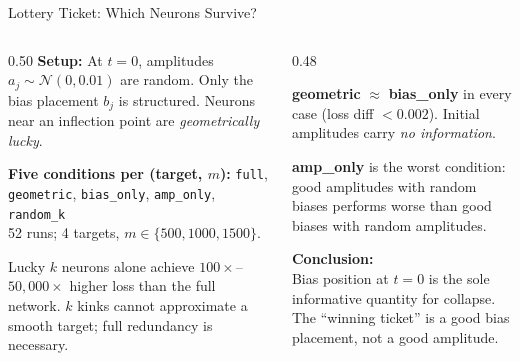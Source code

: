 \documentclass[aspectratio=169, 10pt]{beamer}
\begin{document}
\begin{frame}{Lottery Ticket: Which Neurons Survive?}
  \begin{columns}[T]
    \begin{column}{0.50\textwidth}
      \small
      \textbf{Setup:} At $t=0$, amplitudes
      $a_j \sim \mathcal{N}(0,0.01)$ are random.
      Only the bias placement $b_j$ is structured.
      Neurons near an inflection point are
      \emph{geometrically lucky}.

      \vspace{0.4em}
      \textbf{Five conditions per (target, $m$):}
      \texttt{full}, \texttt{geometric}, \texttt{bias\_only},
      \texttt{amp\_only}, \texttt{random\_k}\\[3pt]
      52 runs; 4 targets, $m \in \{500, 1000, 1500\}$.

      \vspace{0.4em}
      \begin{tcolorbox}[slideboxB, title={Claim 2 (performance): FALSE}]
        \small
        Lucky $k$ neurons alone achieve
        $100\times$--$50{,}000\times$ higher loss
        than the full network.
        $k$ kinks cannot approximate a smooth target;
        full redundancy is necessary.
      \end{tcolorbox}
    \end{column}
    \begin{column}{0.48\textwidth}
      \begin{tcolorbox}[slideboxC,
                        title={Claim 1 (survival): bias position is key}]
        \small
        \textbf{geometric} $\approx$ \textbf{bias\_only}
        in every case (loss diff $< 0.002$).
        Initial amplitudes carry \emph{no information}.

        \vspace{4pt}
        \textbf{amp\_only} is the worst condition:
        good amplitudes with random biases performs
        worse than good biases with random amplitudes.

        \vspace{4pt}
        \textbf{Conclusion:}\\
        Bias position at $t=0$ is the sole
        informative quantity for collapse.
        The ``winning ticket'' is a good bias placement,
        not a good amplitude.
      \end{tcolorbox}
    \end{column}
  \end{columns}
\end{frame}
\end{document}
